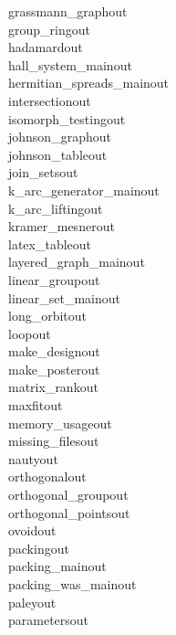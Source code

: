 \begin{tabbing}
grassmann\_graphout\\[0pt]
group\_ringout\\[0pt]
hadamardout\\[0pt]
hall\_system\_mainout\\[0pt]
hermitian\_spreads\_mainout\\[0pt]
intersectionout\\[0pt]
isomorph\_testingout\\[0pt]
johnson\_graphout\\[0pt]
johnson\_tableout\\[0pt]
join\_setsout\\[0pt]
k\_arc\_generator\_mainout\\[0pt]
k\_arc\_liftingout\\[0pt]
kramer\_mesnerout\\[0pt]
latex\_tableout\\[0pt]
layered\_graph\_mainout\\[0pt]
linear\_groupout\\[0pt]
linear\_set\_mainout\\[0pt]
long\_orbitout\\[0pt]
loopout\\[0pt]
make\_designout\\[0pt]
make\_posterout\\[0pt]
matrix\_rankout\\[0pt]
maxfitout\\[0pt]
memory\_usageout\\[0pt]
missing\_filesout\\[0pt]
nautyout\\[0pt]
orthogonalout\\[0pt]
orthogonal\_groupout\\[0pt]
orthogonal\_pointsout\\[0pt]
ovoidout\\[0pt]
packingout\\[0pt]
packing\_mainout\\[0pt]
packing\_was\_mainout\\[0pt]
paleyout\\[0pt]
parametersout\\[0pt]

\end{tabbing}
